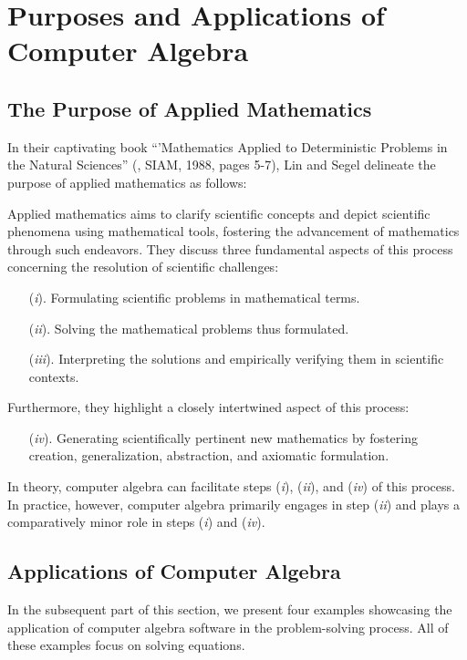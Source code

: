 
\section{Purposes and Applications of Computer Algebra}

\subsection{The Purpose of Applied Mathematics}

In their captivating book ``'{Mathematics Applied to Deterministic Problems in the Natural Sciences}'' (\cite{li1998making}, SIAM, 1988, pages 5-7), Lin and Segel delineate the purpose of applied mathematics as follows:

Applied mathematics aims to clarify scientific concepts and depict scientific phenomena using mathematical tools, fostering the advancement of mathematics through such endeavors. They discuss three fundamental aspects of this process concerning the resolution of scientific challenges:
%
\begin{enumerate}
  \item[(\emph{i}).] Formulating scientific problems in mathematical terms.
  \item[(\emph{ii}).] Solving the mathematical problems thus formulated.
  \item[(\emph{iii}).] Interpreting the solutions and empirically verifying them in scientific contexts.
\end{enumerate}
%
Furthermore, they highlight a closely intertwined aspect of this process:
%
\begin{enumerate}
  \item[(\emph{iv}).] Generating scientifically pertinent new mathematics by fostering creation, generalization, abstraction, and axiomatic formulation.
\end{enumerate}
%
In theory, computer algebra can facilitate steps (\emph{i}), (\emph{ii}), and (\emph{iv}) of this process. In practice, however, computer algebra primarily engages in step (\emph{ii}) and plays a comparatively minor role in steps (\emph{i}) and (\emph{iv}).

\subsection{Applications of Computer Algebra}

In the subsequent part of this section, we present four examples showcasing the application of computer algebra software in the problem-solving process. All of these examples focus on solving equations.

